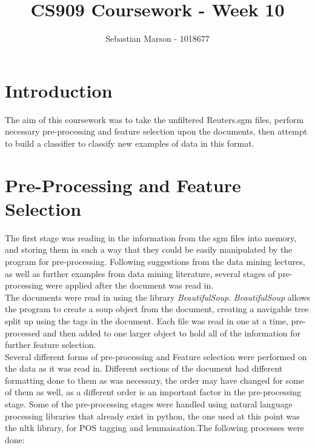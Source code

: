 \documentclass[11pt]{article}
\title{CS909 Coursework - Week 10}
\author{Sebastian Marson - 1018677}
\begin{document}
\maketitle

\section{Introduction}
The aim of this coursework was to take the unfiltered Reuters.sgm files, perform necessary pre-processing and feature selection upon the documents, then attempt to build a classifier to classify new examples of data in this format.

\section{Pre-Processing and Feature Selection}
The first stage was reading in the information from the sgm files into memory, and storing them in such a way that they could be easily manipulated by the program for pre-processing. Following suggestions from the data mining lectures, as well as further examples from data mining literature, several stages of pre-processing were applied after the document was read in. \\

The documents were read in using the library \textit{BeautifulSoup}. \textit{BeautifulSoup} allows the program to create a soup object from the document, creating a navigable tree split up using the tags in the document. Each file was read in one at a time, pre-processed and then added to one larger object to hold all of the information for further feature selection. \\

Several different forms of pre-processing and Feature selection were performed on the data as it was read in. Different sections of the document had different formatting done to them as was necessary, the order may have changed for some of them as well, as a different order is an important factor in the pre-processing stage. Some of the pre-processing stages were handled using natural language processing libraries that already exist in python, the one used at this point was the nltk library, for POS tagging and lemmaisation.The following processes were done: \\
\end{document}
